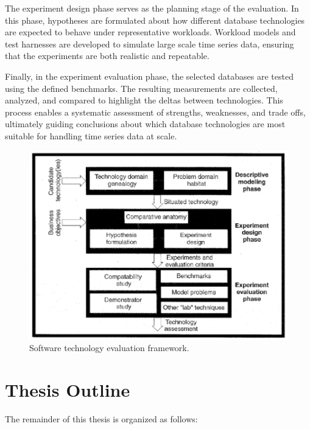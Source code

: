 The experiment design phase serves as the planning stage of the evaluation. In
this phase, hypotheses are formulated about how different database technologies
are expected to behave under representative workloads. Workload models and test
harnesses are developed to simulate large scale time series data, ensuring that
the experiments are both realistic and repeatable.

Finally, in the experiment evaluation phase, the selected databases are tested
using the defined benchmarks. The resulting measurements are collected,
analyzed, and compared to highlight the deltas between technologies. This
process enables a systematic assessment of strengths, weaknesses, and trade
offs, ultimately guiding conclusions about which database technologies are most
suitable for handling time series data at scale.

\begin{figure}
      \centering
      \includegraphics[scale=0.8]{figs/framework.png}
      \caption{Software technology evaluation framework.}\label{fig:framework}
\end{figure}

\newpage
\section{Thesis Outline}
The remainder of this thesis is organized as follows:


